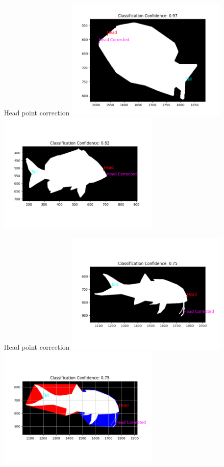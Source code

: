 \begin{frame}{Head point correction}
    \centering
    \includegraphics[height=0.6\textheight,width=0.6\textwidth,keepaspectratio]{images/fs_head_correction1.png}
    \includegraphics[height=0.6\textheight,width=0.6\textwidth,keepaspectratio]{images/fs_head_correction3.png}
\end{frame}

\begin{frame}{Head point correction}
    \centering
    \includegraphics[height=0.6\textheight,width=0.6\textwidth,keepaspectratio]{images/fs_head_correction5.png}
    \includegraphics[height=0.6\textheight,width=0.6\textwidth,keepaspectratio]{images/fs_head_correction6.png}
\end{frame}